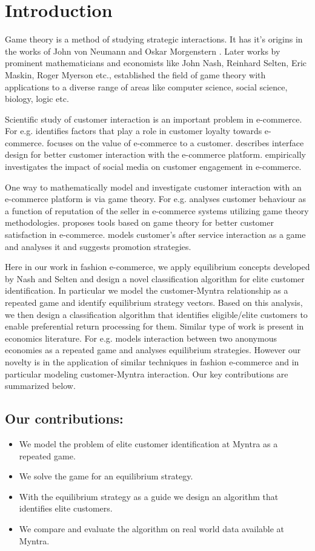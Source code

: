 \section{Introduction}
Game theory is a method of studying strategic interactions. It has it's origins in the works of John von Neumann
and Oskar Morgenstern \cite{OandJ}. Later works by prominent mathematicians and economists like John Nash, Reinhard Selten, Eric Maskin, Roger Myerson  etc., established the field of game theory with applications to a diverse range of areas like computer science, social science, biology, logic etc. 

Scientific study of customer interaction is an important problem in e-commerce. For e.g.  \cite{Ge} identifies factors that play a role in customer loyalty towards e-commerce. \cite{Ke} focuses on the value of e-commerce to a customer. \cite{HK} describes interface design for better customer interaction with the e-commerce platform. \cite{BG} empirically investigates the impact of social media on customer engagement in e-commerce.  

One way to mathematically model and investigate customer interaction with an e-commerce platform is via game theory. For e.g.
\cite{RDV} analyses customer behaviour as a function of reputation of the seller in e-commerce systems utilizing game theory methodologies.
\cite{GM} proposes tools based on game theory for better customer satisfaction in e-commerce. \cite{LLZ} models customer's after service interaction as a game and analyses it and suggests promotion strategies.

Here in our work in fashion e-commerce, we apply equilibrium concepts developed by Nash and Selten and design a novel classification algorithm for elite customer identification. In particular we model the customer-Myntra relationship as a repeated game and identify equilibrium strategy vectors. Based on this analysis, we then design a classification algorithm that identifies eligible/elite customers to enable preferential return processing for them. Similar type of work is present in economics literature. For e.g.\cite{CCB} models interaction between two anonymous economies as a repeated game and analyses equilibrium strategies. However our novelty is in the application of similar techniques in fashion e-commerce and in particular modeling customer-Myntra interaction. Our key contributions are summarized below. 

\subsection*{Our contributions:}
\begin{itemize}
    \item We model the problem of elite customer identification at Myntra as a repeated game.
    \item We solve the game for an equilibrium strategy.
    \item With the equilibrium strategy as a guide we design an algorithm that identifies elite customers.
    \item We compare and evaluate the algorithm on real world data available at Myntra.
\end{itemize}
